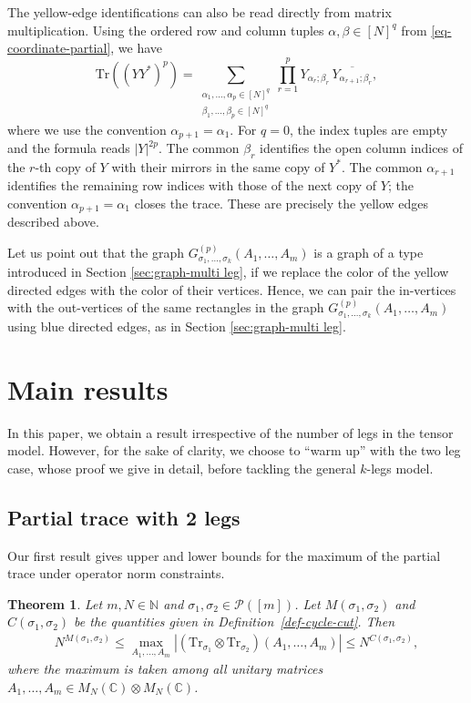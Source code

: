 \documentclass[12pt]{article}
\numberwithin{equation}{section}
\theoremstyle{plain}
\newtheorem{theorem}{Theorem}[section]
\def\bN{\mathbb N}
\def\bC{\mathbb C}
\def\cP{\mathcal P}
\def\Tr{\mathrm {Tr}}
\begin{document}
The yellow-edge identifications can also be read directly from matrix multiplication. Using the ordered row and column tuples $\alpha,\beta\in[N]^q$ from \eqref{eq-coordinate-partial}, we have
\begin{equation}\label{eq-coordinate-moment}
\Tr((YY^*)^p)
=\sum_{\substack{\alpha_1,\ldots,\alpha_p\in[N]^q\\
                 \beta_1,\ldots,\beta_p\in[N]^q}}
\prod_{r=1}^p Y_{\alpha_r;\beta_r}\,
\overline{Y_{\alpha_{r+1};\beta_r}},
\end{equation}
where we use the convention $\alpha_{p+1}=\alpha_1$.
For $q=0$, the index tuples are empty and the formula reads $|Y|^{2p}$. The common $\beta_r$ identifies the open column indices of the $r$-th copy of $Y$ with their mirrors in the same copy of $Y^*$. The common $\alpha_{r+1}$ identifies the remaining row indices with those of the next copy of $Y$; the convention $\alpha_{p+1}=\alpha_1$ closes the trace. These are precisely the yellow edges described above.

Let us point out that the graph $G^{(p)}_{\sigma_1,\ldots,\sigma_k} (A_1, \ldots, A_m)$ is a graph of a type introduced in Section \ref{sec:graph-multi leg}, if we replace the color of the yellow directed edges with the color of their vertices. Hence, we can pair the in-vertices with the out-vertices of the same rectangles in the graph $G^{(p)}_{\sigma_1,\ldots,\sigma_k} (A_1, \ldots, A_m)$ using blue directed edges, as in Section \ref{sec:graph-multi leg}.

\section{Main results} \label{sec:results}

In this paper, we obtain a result irrespective of the number of legs in the tensor model. However, for the sake of clarity, we choose to ``warm up'' with the two leg case, whose proof we give in detail, before tackling the general $k$-legs model.

\subsection{Partial trace with 2 legs}

Our first result gives upper and lower bounds for the maximum of the partial trace under operator norm constraints.

\begin{theorem} \label{Thm-main}
Let $m,N\in\bN$ and $\sigma_1,\sigma_2\in\cP([m])$. Let $M(\sigma_1,\sigma_2)$ and $C(\sigma_1,\sigma_2)$ be the quantities given in Definition~\ref{def-cycle-cut}. Then
\begin{align*}
    N^{M(\sigma_1,\sigma_2)} \le
    \max_{A_1,\ldots,A_m} \left| \left( \Tr_{\sigma_1} \otimes \Tr_{\sigma_2} \right) \left( A_1, \ldots, A_m \right) \right|
    \le N^{C(\sigma_1,\sigma_2)},
\end{align*}
where the maximum is taken among all unitary matrices $A_1, \ldots, A_m \in M_N(\bC) \otimes M_N(\bC)$.
\end{theorem}
\end{document}

